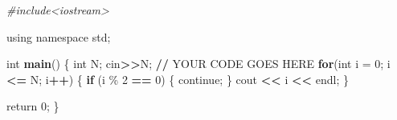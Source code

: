\documentclass[
]{article}
\newenvironment{Shaded}{\begin{snugshade}}{\end{snugshade}}
\newcommand{\AttributeTok}[1]{\textcolor[rgb]{0.13,0.29,0.53}{#1}}
\newcommand{\CommentTok}[1]{\textcolor[rgb]{0.56,0.35,0.01}{\textit{#1}}}
\newcommand{\ControlFlowTok}[1]{\textcolor[rgb]{0.13,0.29,0.53}{\textbf{#1}}}
\newcommand{\DecValTok}[1]{\textcolor[rgb]{0.00,0.00,0.81}{#1}}
\newcommand{\ErrorTok}[1]{\textcolor[rgb]{0.64,0.00,0.00}{\textbf{#1}}}
\newcommand{\FunctionTok}[1]{\textcolor[rgb]{0.13,0.29,0.53}{\textbf{#1}}}
\newcommand{\NormalTok}[1]{#1}
\newcommand{\SpecialCharTok}[1]{\textcolor[rgb]{0.81,0.36,0.00}{\textbf{#1}}}
\begin{document}
\begin{Shaded}
\begin{Highlighting}[]
\CommentTok{\#include\textless{}iostream\textgreater{}}

\NormalTok{using namespace std;}

\NormalTok{int }\FunctionTok{main}\NormalTok{()  \{}
\NormalTok{    int N;}
\NormalTok{    cin}\SpecialCharTok{\textgreater{}}\ErrorTok{\textgreater{}}\NormalTok{N;}
    \SpecialCharTok{/}\ErrorTok{/}\NormalTok{ YOUR CODE GOES HERE}
    \ControlFlowTok{for}\NormalTok{(int }\AttributeTok{i =} \DecValTok{0}\NormalTok{; i }\SpecialCharTok{\textless{}=}\NormalTok{ N; i}\SpecialCharTok{++}\NormalTok{) \{}
        \ControlFlowTok{if}\NormalTok{ (i \% }\DecValTok{2} \SpecialCharTok{==} \DecValTok{0}\NormalTok{) \{}
\NormalTok{            continue;}
\NormalTok{        \}}
\NormalTok{        cout }\SpecialCharTok{\textless{}}\ErrorTok{\textless{}}\NormalTok{ i }\SpecialCharTok{\textless{}}\ErrorTok{\textless{}}\NormalTok{ endl;}
\NormalTok{    \}}
   
\NormalTok{    return }\DecValTok{0}\NormalTok{;}
\NormalTok{\}}
\end{Highlighting}
\end{Shaded}
\end{document}
